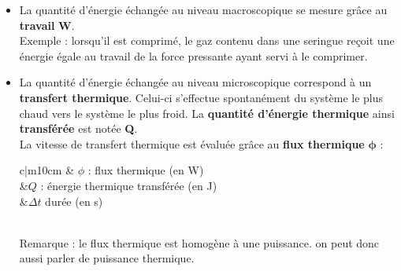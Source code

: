 \documentclass[a4paper,12pt,fleqn]{scrartcl}%
\begin{document}
	\noindent \begin{minipage}{.8\linewidth}
		\begin{itemize}
			\item La quantité d'énergie échangée au niveau macroscopique se mesure grâce au \textbf{travail} $\mathbf{W}$.\\ \textcolor{gray!70}{Exemple : lorsqu'il est comprimé, le gaz contenu dans une seringue reçoit une énergie égale au travail de la force pressante ayant servi à le comprimer.}
			\item La quantité d'énergie échangée au niveau microscopique correspond à un \textbf{transfert thermique}. Celui-ci s'effectue spontanément du système le plus chaud vers le système le plus froid. La \textbf{quantité d'énergie thermique} ainsi \textbf{transférée} est notée \textbf{Q}.\\
			La vitesse de transfert thermique est évaluée grâce au \textbf{flux thermique} $\mathbf{\phi}$ :\\
			
			\begin{tabular}{c|m{10cm}}
				 & $\phi$ : flux thermique (en W)\\
				&$Q$ : énergie thermique transférée (en J)\\
				&$\Delta t$ durée (en s)\\
			\end{tabular}\\
			
			Remarque : le flux thermique est homogène à une puissance. on peut donc aussi parler de puissance thermique.
		\end{itemize}
	\end{minipage}
	\begin{minipage}{.2\linewidth}
		\centering
		\vspace{4cm}
	\end{minipage}
\end{document}
